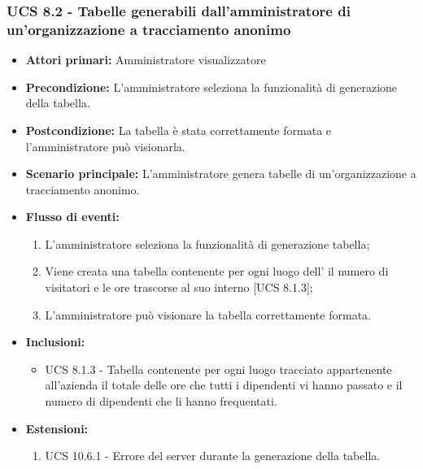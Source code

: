 \subsubsection{UCS 8.2 - Tabelle generabili dall'amministratore di un'organizzazione a tracciamento anonimo}%
\begin{itemize}
\item \textbf{Attori primari:} Amministratore visualizzatore
\item \textbf{Precondizione:} L'amministratore seleziona la funzionalità di generazione della tabella.
\item \textbf{Postcondizione:} La tabella è stata correttamente formata e l'amministratore può visionarla.
\item \textbf{Scenario principale:} L'amministratore genera tabelle di un'organizzazione a tracciamento anonimo.
\item \textbf{Flusso di eventi:}
	\begin{enumerate}%
	\item L'amministratore seleziona la funzionalità di generazione tabella;
	\item Viene creata una tabella contenente per ogni luogo dell' il numero di visitatori e le ore trascorse al suo interno [UCS 8.1.3];
	\item L'amministratore può visionare la tabella correttamente formata.
\end{enumerate}
\item \textbf{Inclusioni:} 
\begin{itemize}
		\item UCS 8.1.3 - Tabella contenente per ogni luogo tracciato appartenente all'azienda il totale delle ore che tutti i dipendenti vi hanno passato e il numero di dipendenti che li hanno frequentati.
	\end{itemize}
	\item \textbf{Estensioni:}
	\begin{enumerate}
		\item UCS 10.6.1 - Errore del server durante la generazione della tabella.
	\end{enumerate}
\end{itemize}
